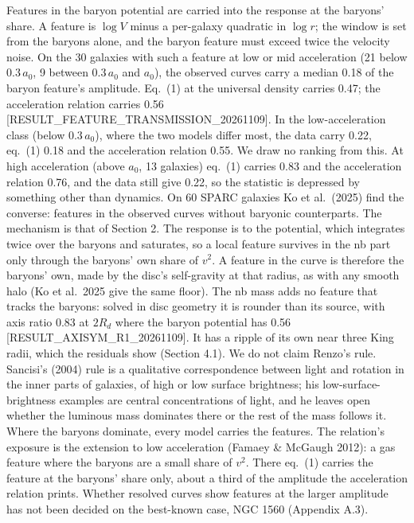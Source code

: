\documentclass[
  10pt,
]{article}
\begin{document}
Features in the baryon potential are carried into the response at the baryons' share. A feature is $\log V$ minus a per-galaxy quadratic in $\log r$; the window is set from the baryons alone, and the baryon feature must exceed twice the velocity noise. On the 30 galaxies with such a feature at low or mid acceleration (21 below $0.3\,a_0$, 9 between $0.3\,a_0$ and $a_0$), the observed curves carry a median 0.18 of the baryon feature's amplitude. Eq.~(1) at the universal density carries 0.47; the acceleration relation carries 0.56 {[}RESULT\_FEATURE\_TRANSMISSION\_20261109{]}. In the low-acceleration class (below $0.3\,a_0$), where the two models differ most, the data carry 0.22, eq.~(1) 0.18 and the acceleration relation 0.55. We draw no ranking from this. At high acceleration (above $a_0$, 13 galaxies) eq.~(1) carries 0.83 and the acceleration relation 0.76, and the data still give 0.22, so the statistic is depressed by something other than dynamics. On 60 SPARC galaxies Ko et al.~(2025) find the converse: features in the observed curves without baryonic counterparts. The mechanism is that of Section 2. The response is to the potential, which integrates twice over the baryons and saturates, so a local feature survives in the nb part only through the baryons' own share of $v^2$. A feature in the curve is therefore the baryons' own, made by the disc's self-gravity at that radius, as with any smooth halo (Ko et al.~2025 give the same floor). The nb mass adds no feature that tracks the baryons: solved in disc geometry it is rounder than its source, with axis ratio 0.83 at $2R_d$ where the baryon potential has 0.56 {[}RESULT\_AXISYM\_R1\_20261109{]}. It has a ripple of its own near three King radii, which the residuals show (Section 4.1). We do not claim Renzo's rule. Sancisi's (2004) rule is a qualitative correspondence between light and rotation in the inner parts of galaxies, of high or low surface brightness; his low-surface-brightness examples are central concentrations of light, and he leaves open whether the luminous mass dominates there or the rest of the mass follows it. Where the baryons dominate, every model carries the features. The relation's exposure is the extension to low acceleration (Famaey \& McGaugh 2012): a gas feature where the baryons are a small share of $v^2$. There eq.~(1) carries the feature at the baryons' share only, about a third of the amplitude the acceleration relation prints. Whether resolved curves show features at the larger amplitude has not been decided on the best-known case, NGC 1560 (Appendix A.3).
\end{document}
